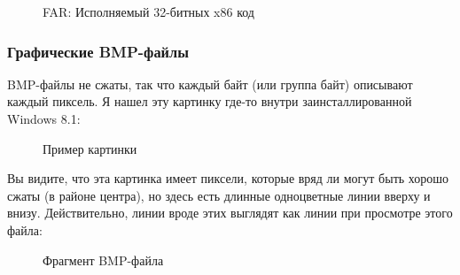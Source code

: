 \begin{figure}[H]
\centering
{}
\caption{FAR: Исполняемый 32-битных x86 код}
\end{figure}


\clearpage
\subsubsection{Графические BMP-файлы}


BMP-файлы не сжаты, так что каждый байт (или группа байт) описывают каждый пиксель.
Я нашел эту картинку где-то внутри заинсталлированной Windows 8.1:

\begin{figure}[H]
\centering
{}
\caption{Пример картинки}
\end{figure}

Вы видите, что эта картинка имеет пиксели, которые вряд ли могут быть хорошо сжаты (в районе центра),
но здесь есть длинные одноцветные линии вверху и внизу.
Действительно, линии вроде этих выглядят как линии при просмотре этого файла:

\begin{figure}[H]
\centering
{}
\caption{Фрагмент BMP-файла}
\end{figure}

